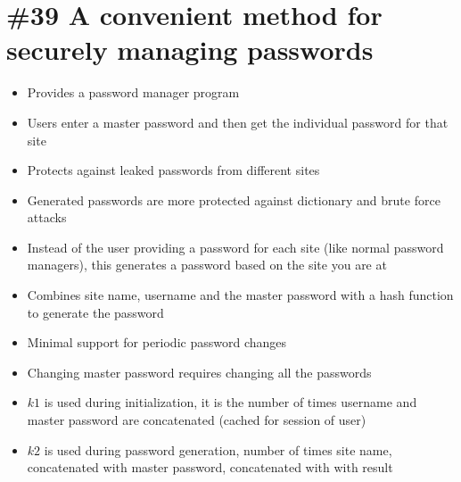 \section{\#39 A convenient method for securely managing passwords}
\begin{itemize}
	\item Provides a password manager program
	\item Users enter a master password and then get the individual password for that site
	\item Protects against leaked passwords from different sites
	\item Generated passwords are more protected against dictionary and brute force attacks
	\item Instead of the user providing a password for each site (like normal password managers), this generates a password based on the site you are at
	\item Combines site name, username and the master password with a hash function to generate the password
	\item Minimal support for periodic password changes
	\item Changing master password requires changing all the passwords
	\item $k1$ is used during initialization, it is the number of times username and master password are concatenated (cached for session of user)
	\item $k2$ is used during password generation, number of times site name, concatenated with master password, concatenated with with result
\end{itemize}
